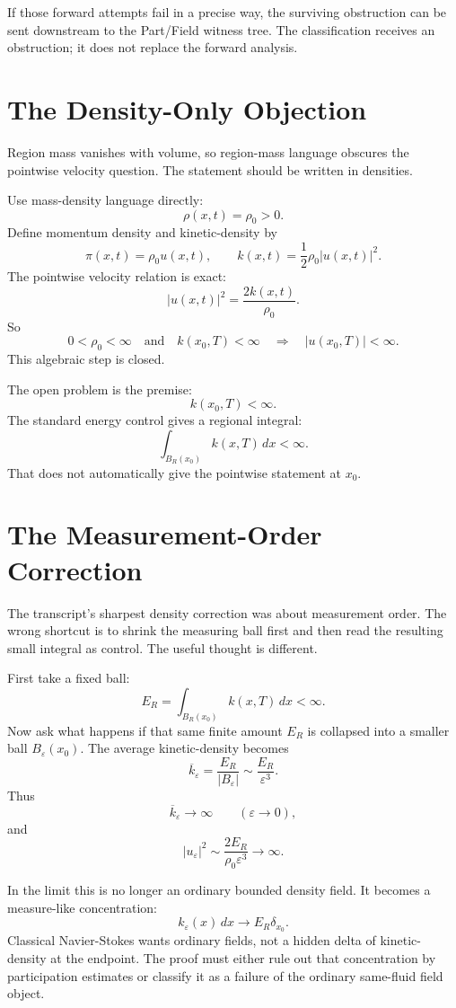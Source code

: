 \documentclass[11pt]{article}
\newcommand{\dd}{\,d}
\begin{document}
If those forward attempts fail in a precise way, the surviving obstruction can be sent downstream to the Part/Field witness tree. The classification receives an obstruction; it does not replace the forward analysis.

\section{The Density-Only Objection}

Region mass vanishes with volume, so region-mass language obscures the pointwise velocity question. The statement should be written in densities.

Use mass-density language directly:
\[
\rho(x,t)=\rho_0>0.
\]
Define momentum density and kinetic-density by
\[
\pi(x,t)=\rho_0u(x,t),
\qquad
k(x,t)=\frac12\rho_0|u(x,t)|^2.
\]
The pointwise velocity relation is exact:
\[
|u(x,t)|^2=\frac{2k(x,t)}{\rho_0}.
\]
So
\[
0<\rho_0<\infty
\quad\text{and}\quad
k(x_0,T)<\infty
\quad\Longrightarrow\quad
|u(x_0,T)|<\infty.
\]
This algebraic step is closed.

The open problem is the premise:
\[
k(x_0,T)<\infty.
\]
The standard energy control gives a regional integral:
\[
\int_{B_R(x_0)}k(x,T)\dd x<\infty.
\]
That does not automatically give the pointwise statement at \(x_0\).

\section{The Measurement-Order Correction}

The transcript's sharpest density correction was about measurement order. The wrong shortcut is to shrink the measuring ball first and then read the resulting small integral as control. The useful thought is different.

First take a fixed ball:
\[
E_R=\int_{B_R(x_0)}k(x,T)\dd x<\infty.
\]
Now ask what happens if that same finite amount \(E_R\) is collapsed into a smaller ball \(B_\varepsilon(x_0)\). The average kinetic-density becomes
\[
\overline{k}_\varepsilon
=
\frac{E_R}{|B_\varepsilon|}
\sim
\frac{E_R}{\varepsilon^3}.
\]
Thus
\[
\overline{k}_\varepsilon\to\infty
\qquad(\varepsilon\to0),
\]
and
\[
|u_\varepsilon|^2
\sim
\frac{2E_R}{\rho_0\varepsilon^3}
\to\infty.
\]

In the limit this is no longer an ordinary bounded density field. It becomes a measure-like concentration:
\[
k_\varepsilon(x)\dd x \to E_R\delta_{x_0}.
\]
Classical Navier-Stokes wants ordinary fields, not a hidden delta of kinetic-density at the endpoint. The proof must either rule out that concentration by participation estimates or classify it as a failure of the ordinary same-fluid field object.
\end{document}
